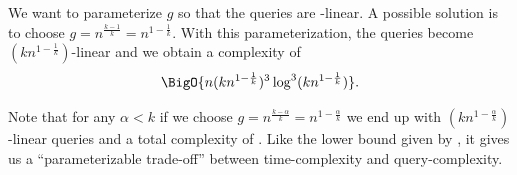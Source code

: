 We want to parameterize \(g\) so that the queries are -linear. A
possible solution is to choose \(g = n^{\frac{k-1}{k}} = n^{1-\frac{1}{k}}\).
With this parameterization, the queries become \((kn^{1-\frac{1}{k}})\)-linear
and we obtain a complexity of
\begin{displaymath}
\BigO{n (kn^{1-\frac{1}{k}})^3 \log^3 (kn^{1-\frac{1}{k}}) }.
\end{displaymath}

Note that for any \(\alpha < k\) if we choose \(g = n^{\frac{k-\alpha}{k}} =
n^{1-\frac{\alpha}{k}}\) we end up with \((kn^{1-\frac{\alpha}{k}})\)-linear
queries and a total complexity of
.
Like the lower bound given by \citet*{ailon:2005}, it gives us a
``parameterizable trade-off''
between time-complexity and query-complexity.
